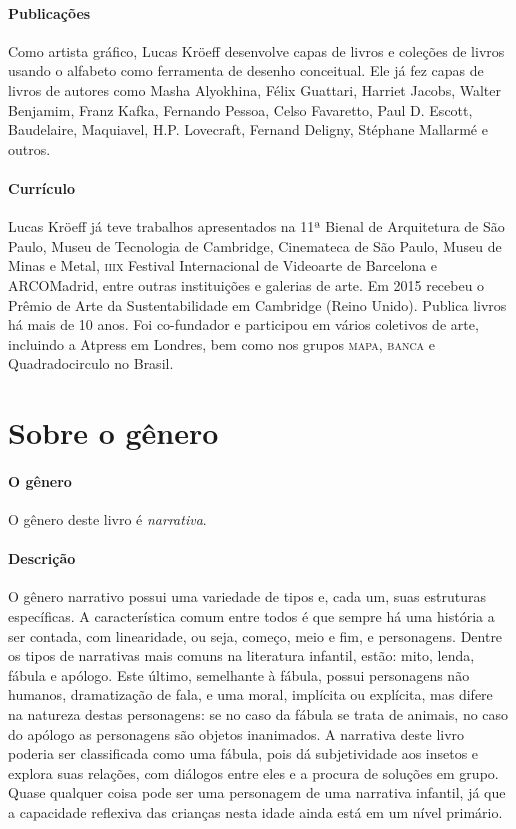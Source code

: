 \documentclass[11pt]{extarticle}
\begin{document}
\paragraph{Publicações} Como artista gráfico, Lucas Kröeff desenvolve capas de livros e coleções de livros usando o alfabeto como ferramenta de desenho conceitual. Ele já fez capas de livros de autores como Masha Alyokhina, Félix Guattari, Harriet Jacobs, Walter Benjamim, Franz Kafka, Fernando Pessoa, Celso Favaretto, Paul D. Escott, Baudelaire, Maquiavel, H.P. Lovecraft, Fernand Deligny, Stéphane Mallarmé e outros.

\paragraph{Currículo} Lucas Kröeff já teve trabalhos apresentados na 11ª Bienal de Arquitetura de São Paulo, Museu de Tecnologia de Cambridge, Cinemateca de São Paulo, Museu de Minas e Metal, \textsc{iiix} Festival Internacional de Videoarte de Barcelona e ARCOMadrid, entre outras instituições e galerias de arte. Em 2015 recebeu o Prêmio de Arte da Sustentabilidade em Cambridge (Reino Unido). Publica livros há mais de 10 anos.
Foi co-fundador e participou em vários coletivos de arte, incluindo a Atpress em Londres, bem como nos grupos \textsc{mapa}, \textsc{banca} e Quadradocirculo no Brasil.


\section{Sobre o gênero}

\paragraph{O gênero} O gênero deste livro é \textit{narrativa}. 

\paragraph{Descrição} 
O gênero narrativo possui uma variedade de tipos e, cada um, suas estruturas específicas.
A característica comum entre todos é que sempre há uma história a ser contada, com linearidade,
ou seja, começo, meio e fim, e personagens. 
Dentre os tipos de narrativas mais comuns na literatura infantil, estão: mito, lenda, 
fábula e apólogo. Este último, semelhante à fábula, possui personagens não humanos, 
dramatização de fala, e uma moral, implícita ou explícita, mas difere na natureza destas 
personagens: se no caso da fábula se trata de animais, no caso do apólogo as personagens 
são objetos inanimados. A narrativa deste livro poderia ser classificada como uma fábula, pois dá subjetividade aos insetos e explora suas relações, com diálogos entre eles e a procura de soluções em grupo. Quase qualquer coisa pode ser uma personagem de uma narrativa 
infantil, já que a capacidade reflexiva das crianças nesta idade ainda está em um nível primário. 
\end{document}
